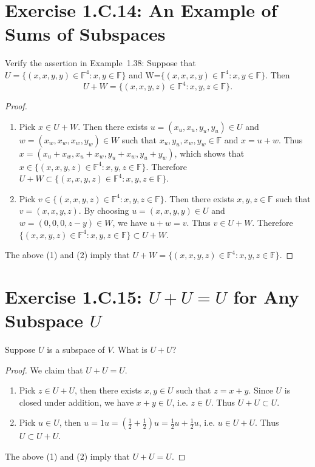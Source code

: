 \section{Exercise 1.C.14: An Example of Sums of Subspaces}
Verify the assertion in Example~1.38: Suppose that $U=\{(x,x,y,y)\in\mathbb{F}^4: x,y\in\mathbb{F}\}$ and W=$\{(x,x,x,y)\in\mathbb{F}^4:x,y\in\mathbb{F}\}$. Then
\[
U+W=\{(x,x,y,z)\in\mathbb{F}^4:x,y,z\in\mathbb{F}\}.
\]
\begin{proof}
\begin{enumerate}
\item Pick $x\in U+W$. Then there exists $u=(x_u,x_u,y_u,y_u)\in U$ and $w=(x_w,x_w,x_w,y_w)\in W$ such that $x_u, y_u, x_w, y_w\in \mathbb{F}$ and $x=u+w$. Thus $x=(x_u+x_w,x_u+x_w,y_u+x_w,y_u+y_w)$, which shows that $x\in \{(x,x,y,z)\in\mathbb{F}^4:x,y,z\in\mathbb{F}\}$. Therefore $U+W\subset \{(x,x,y,z)\in\mathbb{F}^4:x,y,z\in\mathbb{F}\}$.
\item Pick $v\in\{(x,x,y,z)\in\mathbb{F}^4:x,y,z\in\mathbb{F}\}$. Then there exists $x,y,z\in\mathbb{F}$ such that $v=(x,x,y,z)$. By choosing $u=(x,x,y,y)\in U$ and $w=(0,0,0,z-y)\in W$, we have $u+w=v$. Thus $v\in U+W$. Therefore $\{(x,x,y,z)\in\mathbb{F}^4:x,y,z\in\mathbb{F}\}\subset U+W$.
\end{enumerate}
The above (1) and (2) imply that $U+W=\{(x,x,y,z)\in\mathbb{F}^4:x,y,z\in\mathbb{F}\}$.
\end{proof}

\section{Exercise 1.C.15: $U+U=U$ for Any Subspace $U$}
Suppose $U$ is a subspace of $V$. What is $U+U$?
\begin{proof}
We claim that $U+U=U$.
\begin{enumerate}
\item Pick $z\in U+U$, then there exists $x,y\in U$ such that $z=x+y$. Since $U$ is closed under addition, we have $x+y\in U$, i.e. $z\in U$. Thus $U+U\subset U$.
\item Pick $u\in U$, then $u=1u=(\frac{1}{2}+\frac{1}{2})u=\frac{1}{2}u+\frac{1}{2}u$, i.e. $u\in U+U$. Thus $U\subset U+U$.
\end{enumerate}
The above (1) and (2) imply that $U+U=U$.
\end{proof}

